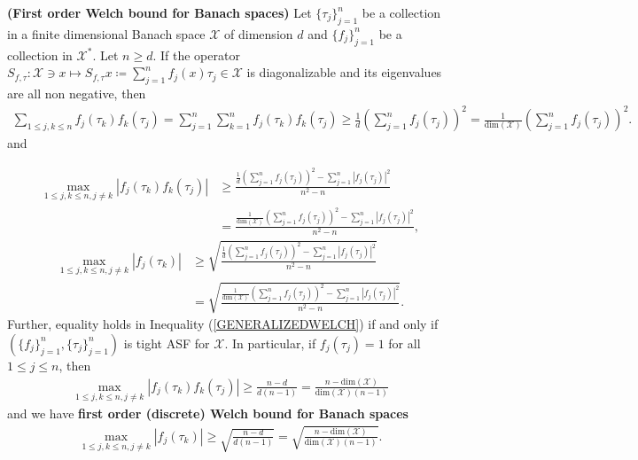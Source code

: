 \documentclass[10pt,a4paper]{amsart}
\begin{document}
  \begin{theorem}\label{FIRSTWELCHBANACH}
  \textbf{(First order  Welch bound for Banach spaces)}	Let $\{\tau_j\}_{j=1}^n$ be a collection in a finite dimensional Banach space $\mathcal{X}$ of dimension $d$  and 	$\{f_j\}_{j=1}^n$ be a collection in  $\mathcal{X}^*.$ Let $n\geq d$. If the  operator 
  $	S_{f, \tau}:\mathcal{X}\ni x \mapsto S_{f, \tau}x\coloneqq \sum_{j=1}^n
  	f_j(x)\tau_j \in
  	\mathcal{X}$ is diagonalizable and its eigenvalues are all non negative, then 
  	\begin{align}\label{GENERALIZEDWELCH}
 \sum_{1\leq j, k \leq n}f_j(\tau_k)f_k(\tau_j)= \sum_{j=1}^n\sum_{k=1}^nf_j(\tau_k)f_k(\tau_j)\geq \frac{1}{d}	\left(\sum_{j=1}^n
  f_j(\tau_j)\right)^2=\frac{1}{\text{dim}(\mathcal{X})}	\left(\sum_{j=1}^n
  f_j(\tau_j)\right)^2.
  	\end{align}
  	and 
  	
  	\begin{align*}
  \max _{1\leq j,k \leq n, j\neq k}|f_j(\tau_k)f_k(\tau_j)|&\geq \frac{\frac{1}{d}	\left(\sum_{j=1}^n
  	f_j(\tau_j)\right)^2-	\sum_{j=1}^n
  	|f_j(\tau_j)|^2}{n^2-n}\\
  &=\frac{\frac{1}{\text{dim}(\mathcal{X})}	\left(\sum_{j=1}^n
  	f_j(\tau_j)\right)^2-	\sum_{j=1}^n
  	|f_j(\tau_j)|^2}{n^2-n},
  	\end{align*}
  	\begin{align*}
  	\max _{1\leq j,k \leq n, j\neq k}|f_j(\tau_k)|&\geq \sqrt{\frac{\frac{1}{d}	\left(\sum_{j=1}^n
  			f_j(\tau_j)\right)^2-	\sum_{j=1}^n
  			|f_j(\tau_j)|^2}{n^2-n}}\\
  		&=\sqrt{\frac{\frac{1}{\text{dim}(\mathcal{X})}	\left(\sum_{j=1}^n
  				f_j(\tau_j)\right)^2-	\sum_{j=1}^n
  				|f_j(\tau_j)|^2}{n^2-n}}.
  	\end{align*}
  	Further, equality holds in Inequality (\ref{GENERALIZEDWELCH}) if and only if $ (\{f_j \}_{j=1}^n, \{\tau_j \}_{j=1}^n) $ is  tight  ASF for $\mathcal{X}$. 
  	In particular, if $f_j(\tau_j)=1$ for all $1\leq j \leq n$, then 
  \begin{align*}
  \max _{1\leq j,k \leq n, j\neq k}|f_j(\tau_k)f_k(\tau_j)|\geq \frac{n-d}{d(n-1)}=\frac{n-\text{dim}(\mathcal{X})}{\text{dim}(\mathcal{X})(n-1)}
  \end{align*}
  and we have \textbf{first order (discrete) Welch bound for Banach spaces}
  \begin{align*}
	 \max _{1\leq j,k \leq n, j\neq k}|f_j(\tau_k)|\geq \sqrt{\frac{n-d}{d(n-1)}}= \sqrt{\frac{n-\text{dim}(\mathcal{X})}{\text{dim}(\mathcal{X})(n-1)}}.
  \end{align*}
  \end{theorem}
\end{document}
